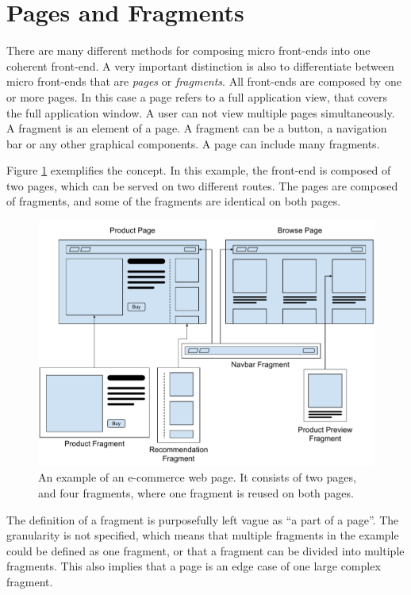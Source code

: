 \section{Pages and Fragments}

There are many different methods for composing micro front-ends into one coherent front-end. A very important distinction is also to differentiate between micro front-ends that are \textit{pages} or \textit{fragments}. All front-ends are composed by one or more pages. In this case a page refers to a full application view, that covers the full application window. A user can not view multiple pages simultaneously. A fragment is an element of a page. A fragment can be a button, a navigation bar or any other graphical components. A page can include many fragments.

Figure \ref{fig:fragment-page} exemplifies the concept. In this example, the front-end is composed of two pages, which can be served on two different routes. The pages are composed of fragments, and some of the fragments are identical on both pages.

\begin{figure}
    \centering
    \includegraphics[width=0.9\linewidth]{images/fragment-page.pdf}
    \caption{An example of an e-commerce web page. It consists of two pages, and four fragments, where one fragment is reused on both pages.}
    \label{fig:fragment-page}
\end{figure}

The definition of a fragment is purposefully left vague as ``a part of a page''. The granularity is not specified, which means that multiple fragments in the example could be defined as one fragment, or that a fragment can be divided into multiple fragments. This also implies that a page is an edge case of one large complex fragment.

